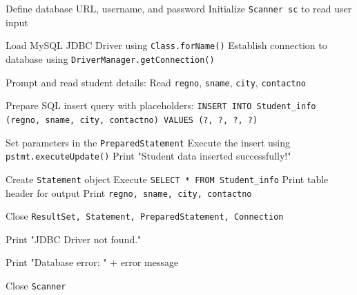 \begin{algorithm}[H]
\caption{JDBC Student Database Insertion and Retrieval}
\begin{algorithmic}[1]
\STATE Define database URL, username, and password
\STATE Initialize \texttt{Scanner sc} to read user input

\TRY
    \STATE Load MySQL JDBC Driver using \texttt{Class.forName()}
    \STATE Establish connection to database using \texttt{DriverManager.getConnection()}
    
    \STATE Prompt and read student details:
    \STATE \quad Read \texttt{regno}, \texttt{sname}, \texttt{city}, \texttt{contactno}
    
    \STATE Prepare SQL insert query with placeholders:
    \STATE \quad \texttt{INSERT INTO Student\_info (regno, sname, city, contactno) VALUES (?, ?, ?, ?)}
    
    \STATE Set parameters in the \texttt{PreparedStatement}
    \STATE Execute the insert using \texttt{pstmt.executeUpdate()}
    \STATE Print "Student data inserted successfully!"

    \STATE Create \texttt{Statement} object
    \STATE Execute \texttt{SELECT * FROM Student\_info}
    \STATE Print table header for output
        \STATE Print \texttt{regno, sname, city, contactno}
    \ENDWHILE

    \STATE Close \texttt{ResultSet, Statement, PreparedStatement, Connection}

        \STATE Print "JDBC Driver not found."

        \STATE Print "Database error: " + error message

    \FINALLY
        \STATE Close \texttt{Scanner}
\end{algorithmic}
\end{algorithm}
